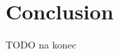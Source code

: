 \documentclass[12pt,a4paper]{article}
\begin{document}


\newpage
\section{Conclusion}
TODO na konec

\newpage


\end{document}
